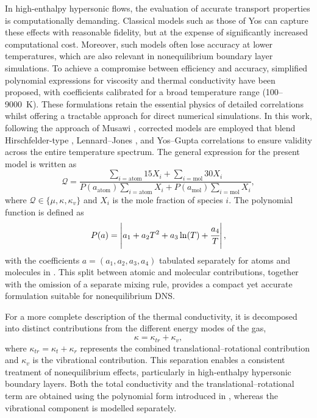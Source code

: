 In high-enthalpy hypersonic flows, the evaluation of accurate transport properties is computationally demanding. Classical models such as those of Yos \citep{Yos1963} can capture these effects with reasonable fidelity, but at the expense of significantly increased computational cost. Moreover, such models often lose accuracy at lower temperatures, which are also relevant in nonequilibrium boundary layer simulations. To achieve a compromise between efficiency and accuracy, simplified polynomial expressions for viscosity and thermal conductivity have been proposed, with coefficients calibrated for a broad temperature range (100--9000~K). These formulations retain the essential physics of detailed correlations whilst offering a tractable approach for direct numerical simulations. In this work, following the approach of Musawi \citep{Musawi2025}, corrected models are employed that blend Hirschfelder-type \citep{Hirschfelder1954}, Lennard--Jones \citep{Matyushov1996}, and Yos--Gupta \citep{Yos1963,Gupta1990} correlations to ensure validity across the entire temperature spectrum. The general expression for the present model is written as
\begin{equation}
\mathcal{Q} =
\frac{\sum\limits_{i=\mathrm{atom}} 15X_i + \sum\limits_{i=\mathrm{mol}} 30X_i}
     {P(a_{\mathrm{atom}}) \sum\limits_{i=\mathrm{atom}} X_i + P(a_{\mathrm{mol}}) \sum\limits_{i=\mathrm{mol}} X_i},
\label{eq:present_model}
\end{equation}
where $\mathcal{Q} \in \{\mu, \kappa, \kappa_v\}$ and $X_i$ is the mole fraction of species $i$. The polynomial function is defined as
\begin{equation}
P(a) = \left|a_1 + a_2 T^2 + a_3 \ln(T) + \cfrac{a_4}{T}\right|,
\label{eq:present_poly}
\end{equation}
with the coefficients $a = (a_1, a_2, a_3, a_4)$ tabulated separately for atoms and molecules in . This split between atomic and molecular contributions, together with the omission of a separate mixing rule, provides a compact yet accurate formulation suitable for nonequilibrium DNS.

For a more complete description of the thermal conductivity, it is decomposed into distinct contributions from the different energy modes of the gas,
\begin{equation}
\kappa = \kappa_{tr} + \kappa_v,
\label{eq:thermal_modes}
\end{equation}
where $\kappa_{tr} = \kappa_t + \kappa_r$ represents the combined translational--rotational contribution and $\kappa_v$ is the vibrational contribution. This separation enables a consistent treatment of nonequilibrium effects, particularly in high-enthalpy hypersonic boundary layers. Both the total conductivity and the translational--rotational term are obtained using the polynomial form introduced in , whereas the vibrational component is modelled separately.

